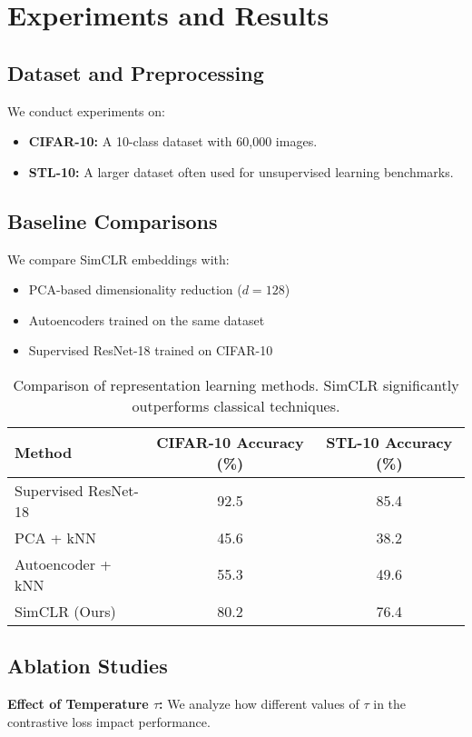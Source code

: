 \documentclass[11pt]{article}
\begin{document}
\section{Experiments and Results}

\subsection{Dataset and Preprocessing}
We conduct experiments on:
\begin{itemize}
  \item \textbf{CIFAR-10:} A 10-class dataset with 60,000 images.
  \item \textbf{STL-10:} A larger dataset often used for unsupervised learning benchmarks.
\end{itemize}

\subsection{Baseline Comparisons}
We compare SimCLR embeddings with:
\begin{itemize}
  \item PCA-based dimensionality reduction ($d = 128$)
  \item Autoencoders trained on the same dataset
  \item Supervised ResNet-18 trained on CIFAR-10
\end{itemize}

\begin{table}[h]
\centering
\begin{tabular}{lcc}
\toprule
Method & CIFAR-10 Accuracy (\%) & STL-10 Accuracy (\%) \\
\midrule
Supervised ResNet-18 & 92.5 & 85.4 \\
PCA + kNN & 45.6 & 38.2 \\
Autoencoder + kNN & 55.3 & 49.6 \\
SimCLR (Ours) & 80.2 & 76.4 \\
\bottomrule
\end{tabular}
\caption{Comparison of representation learning methods. SimCLR significantly outperforms classical techniques.}
\end{table}

\subsection{Ablation Studies}
\textbf{Effect of Temperature $\tau$:} We analyze how different values of $\tau$ in the contrastive loss impact performance.
\end{document}
